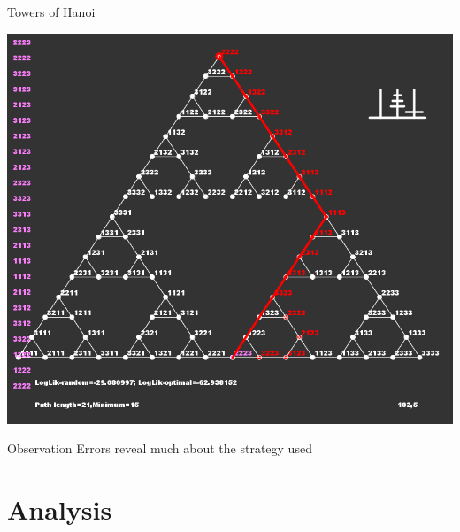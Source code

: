 \documentclass[xcolor=table,handout]{beamer}
\begin{document}
\begin{frame}{Towers of Hanoi}
\centerline{
 \includegraphics[height=.9\textheight]{toh.png}}
\end{frame}

\begin{frame}{Observation}
  Errors reveal much about the strategy used
\end{frame}

\section{Analysis}
\label{sec:analysis}
\end{document}
